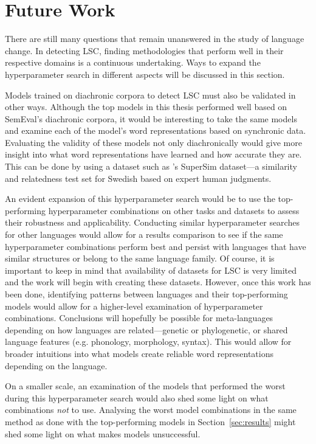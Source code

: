 \section{Future Work}
\label{sec:futurework}

There are still many questions that remain unanswered in the study of language change. In detecting LSC, finding methodologies that perform well in their respective domains is a continuous undertaking. Ways to expand the hyperparameter search in different aspects will be discussed in this section.

Models trained on diachronic corpora to detect LSC must also be validated in other ways. Although the top models in this thesis performed well based on SemEval’s diachronic corpora, it would be interesting to take the same models and examine each of the model’s word representations based on synchronic data. Evaluating the validity of these models not only diachronically would give more insight into what word representations have learned and how accurate they are. This can be done by using a dataset such as \citet{supersim2021}'s SuperSim dataset—a similarity and relatedness test set for Swedish based on expert human judgments. 

An evident expansion of this hyperparameter search would be to use the top-performing hyperparameter combinations on other tasks and datasets to assess their robustness and applicability. Conducting similar hyperparameter searches for other languages would allow for a results comparison to see if the same hyperparameter combinations perform best and persist with languages that have similar structures or belong to the same language family. Of course, it is important to keep in mind that availability of datasets for LSC is very limited and the work will begin with creating these datasets. However, once this work has been done, identifying patterns between languages and their top-performing models would allow for a higher-level examination of hyperparameter combinations. Conclusions will hopefully be possible for meta-languages depending on how languages are related—genetic or phylogenetic, or shared language features (e.g. phonology, morphology, syntax). This would allow for broader intuitions into what models create reliable word representations depending on the language.

On a smaller scale, an examination of the models that performed the worst during this hyperparameter search would also shed some light on what combinations \emph{not} to use. Analysing the worst model combinations in the same method as done with the top-performing models in Section~\ref{sec:results} might shed some light on what makes models unsuccessful. 

